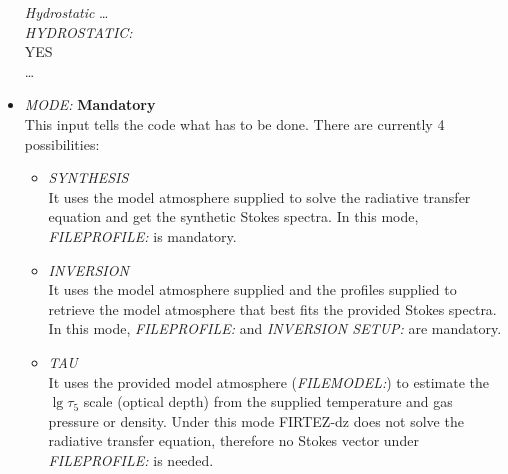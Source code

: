 \begin{itemize}
\begin{ifbox}[label={tb:hydrostatic}]{{\it Hydrostatic}}
  \scriptsize
  \ldots\\
  {\it HYDROSTATIC:}\\
  YES\\
  \ldots
  \normalsize
\end{ifbox}

  \item {\it MODE:} {\bf Mandatory}\\

  This input tells the code what has to be done. There are currently 4 possibilities:

  \begin{itemize}
    \item {\it SYNTHESIS}\\
    It uses the model atmosphere supplied to solve the radiative transfer equation and get the synthetic Stokes spectra. In this mode, {\it FILEPROFILE:} is mandatory.

    \item {\it INVERSION}\\
    It uses the model atmosphere supplied and the profiles supplied to retrieve the model atmosphere that best fits the provided Stokes spectra. In this mode, {\it FILEPROFILE:} and {\it INVERSION SETUP:} are mandatory.

    \item {\it TAU}\\
    It uses the provided model atmosphere ({\it FILEMODEL:}) to estimate the $\lg\tau_{5}$ scale (optical depth) from the supplied temperature and gas pressure or density. Under this mode FIRTEZ-dz does not solve the radiative transfer equation, therefore no Stokes vector under {\it FILEPROFILE:} is needed.


\end{itemize}
\end{itemize}
